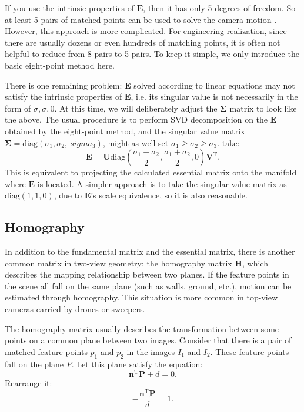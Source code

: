 If you use the intrinsic properties of $\mathbf{E}$, then it has only 5 degrees of freedom. So at least 5 pairs of matched points can be used to solve the camera motion \textsuperscript{\cite{Li2006, Nister2004a}}. However, this approach is more complicated. For engineering realization, since there are usually dozens or even hundreds of matching points, it is often not helpful to reduce from 8 pairs to 5 pairs. To keep it simple, we only introduce the basic eight-point method here.

There is one remaining problem: $\mathbf{E}$ solved according to linear equations may not satisfy the intrinsic properties of $\mathbf{E}$, i.e. its singular value is not necessarily in the form of ${\sigma}, {\sigma}, 0$. At this time, we will deliberately adjust the $\mathbf{\Sigma}$ matrix to look like the above. The usual procedure is to perform SVD decomposition on the $\mathbf{E}$ obtained by the eight-point method, and the singular value matrix $\mathbf{\Sigma} = \mathrm{diag} (\sigma_1, \sigma_2, \ sigma_3)$, might as well set $\sigma_1 \geqslant \sigma_2 \geqslant \sigma_3$. take:
\begin{equation}
\mathbf{E} = \mathbf{U} \mathrm{diag} (\frac{\sigma_1+\sigma_2}{2}, \frac{\sigma_1+\sigma_2}{2}, 0) \mathbf{V}^\mathrm{T}.
\end{equation}
This is equivalent to projecting the calculated essential matrix onto the manifold where $\mathbf{E}$ is located. A simpler approach is to take the singular value matrix as $\mathrm{diag} (1,1,0)$, due to $\mathbf{E}$'s scale equivalence, so it is also reasonable.

\subsection{Homography}
In addition to the fundamental matrix and the essential matrix, there is another common matrix in two-view geometry: the homography matrix $\mathbf{H}$, which describes the mapping relationship between two planes. If the feature points in the scene all fall on the same plane (such as walls, ground, etc.), motion can be estimated through homography. This situation is more common in top-view cameras carried by drones or sweepers. 

The homography matrix usually describes the transformation between some points on a common plane between two images. Consider that there is a pair of matched feature points $p_{1}$ and $p_{2}$ in the images $I_{1}$ and $I_{2}$. These feature points fall on the plane $P$. Let this plane satisfy the equation:
\begin{equation}
\mathbf{n}^\mathrm{T} \mathbf{P} + d = 0.
\end{equation}
Rearrange it:
\begin{equation}
- \frac{\mathbf{n}^\mathrm{T} \mathbf{P} }{d} = 1.
\end{equation}

